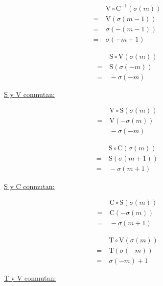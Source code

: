 \begin{center}
\begin{multicols}{3}
			\begin{align*}
			&\ \text{V}\circ\text{C}^{-1}(\sigma(m))\\
			=&\ \text{V}(\sigma(m-1))\\
			=&\ \sigma(-(m-1))\\
			=&\ \sigma(-m+1)
			\end{align*}
		\end{multicols}
		
		\begin{multicols}{3}
			\begin{align*}
			&\ \text{S}\circ\text{V}(\sigma(m))\\
			=&\ \text{S}(\sigma(-m))\\
			=&\ -\sigma(-m)
			\end{align*}
			
			\underline{S y V conmutan:}
			
			\begin{align*}
			&\ \text{V}\circ\text{S}(\sigma(m))\\
			=&\ \text{V}(-\sigma(m))\\
			=&\ -\sigma(-m)
			\end{align*}
		\end{multicols}
		
		\begin{multicols}{3}
			\begin{align*}
			&\ \text{S}\circ\text{C}(\sigma(m))\\
			=&\ \text{S}(\sigma(m+1))\\
			=&\ -\sigma(m+1)
			\end{align*}
			
			\underline{S y C conmutan:}
			
			\begin{align*}
			&\ \text{C}\circ\text{S}(\sigma(m))\\
			=&\ \text{C}(-\sigma(m))\\
			=&\ -\sigma(m+1)
			\end{align*}
		\end{multicols}
	
		\begin{multicols}{3}
			\begin{align*}
			&\ \text{T}\circ\text{V}(\sigma(m))\\
			=&\ \text{T}(\sigma(-m))\\
			=&\ \sigma(-m)+1
			\end{align*}
			
			\underline{T y V conmutan:}
			

\end{multicols}
\end{center}
